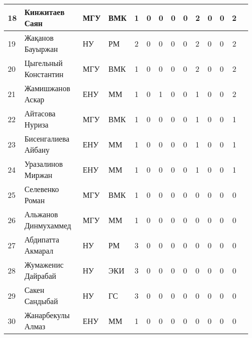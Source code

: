 \documentclass[11pt, a4paper]{article}
\begin{document}
\begin{center}
\begin{tabularx}{\textwidth}{|l|l|l|l|c|*{7}{X|}c|c|}
 \hline 
18 & Кинжитаев Саян  & МГУ & ВМК & 1 & 0 & 0 & 0 & 0 & 2 & 0 & 0 & 2 & \\ 
 \hline 
19 & Жақанов Бауыржан  & НУ & РМ & 2 & 0 & 0 & 0 & 0 & 2 & 0 & 0 & 2 & \\ 
 \hline 
20 & Цыгельный Константин & МГУ & ВМК & 1 & 0 & 0 & 0 & 0 & 2 & 0 & 0 & 2 & \\ 
 \hline 
21 & Жамишжанов Аскар & ЕНУ & ММ & 1 & 0 & 1 & 0 & 0 & 1 & 0 & 0 & 2 & \\ 
 \hline 
22 & Айтасова Нуриза & МГУ & ВМК & 1 & 0 & 0 & 0 & 0 & 1 & 0 & 0 & 1 & \\ 
 \hline 
23 & Бисенгалиева Айбану  & ЕНУ & ММ & 1 & 0 & 0 & 0 & 0 & 1 & 0 & 0 & 1 & \\ 
 \hline 
24 & Уразалинов Миржан & ЕНУ & ММ & 1 & 0 & 0 & 0 & 0 & 1 & 0 & 0 & 1 & \\ 
 \hline 
25 & Селевенко Роман  & МГУ & ВМК & 1 & 0 & 0 & 0 & 0 & 0 & 0 & 0 & 0 & \\ 
 \hline 
26 & Альжанов Динмухаммед & МГУ & ММ & 1 & 0 & 0 & 0 & 0 & 0 & 0 & 0 & 0 & \\ 
 \hline 
27 & Абдипатта Акмарал & НУ & РМ & 3 & 0 & 0 & 0 & 0 & 0 & 0 & 0 & 0 & \\ 
 \hline 
28 & Жумаженис Дайрабай & НУ & ЭКИ & 3 & 0 & 0 & 0 & 0 & 0 & 0 & 0 & 0 & \\ 
 \hline 
29 & Сакен Сандыбай & НУ & ГС & 3 & 0 & 0 & 0 & 0 & 0 & 0 & 0 & 0 & \\ 
 \hline 
30 & Жанарбекулы Алмаз  & ЕНУ & ММ & 1 & 0 & 0 & 0 & 0 & 0 & 0 & 0 & 0 & \\ 
 \hline 
\end{tabularx}
\end{center}
\end{document}
